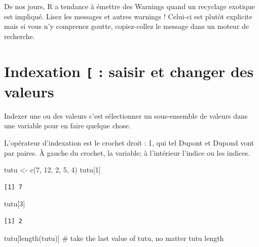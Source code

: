 \documentclass[
  letterpaper,
  DIV=11,
  numbers=noendperiod]{scrreprt}
\newenvironment{Shaded}{\begin{snugshade}}{\end{snugshade}}
\newcommand{\CommentTok}[1]{\textcolor[rgb]{0.37,0.37,0.37}{#1}}
\newcommand{\DecValTok}[1]{\textcolor[rgb]{0.68,0.00,0.00}{#1}}
\newcommand{\FunctionTok}[1]{\textcolor[rgb]{0.28,0.35,0.67}{#1}}
\newcommand{\NormalTok}[1]{\textcolor[rgb]{0.00,0.23,0.31}{#1}}
\newcommand{\OtherTok}[1]{\textcolor[rgb]{0.00,0.23,0.31}{#1}}
\begin{document}
De nos jours, R a tendance à émettre des Warnings quand un recyclage
exotique est impliqué. Lisez les messages et autres warnings ! Celui-ci
est plutôt explicite mais si vous n'y comprenez goutte, copiez-collez le
message dans un moteur de recherche.

\hypertarget{indexation-saisir-et-changer-des-valeurs}{%
\section{\texorpdfstring{Indexation \texttt{{[}} : saisir et changer des
valeurs}{Indexation {[} : saisir et changer des valeurs}}\label{indexation-saisir-et-changer-des-valeurs}}

Indexer une ou des valeurs c'est sélectionner un sous-ensemble de
valeurs dans une variable pour en faire quelque chose.

L'opérateur d'indexation est le crochet droit : \texttt{{[}}, qui tel
Dupont et Dupond vont par paires. À gauche du crochet, la variable; à
l'intérieur l'indice ou les indices.

\begin{Shaded}
\begin{Highlighting}[]
\NormalTok{tutu }\OtherTok{\textless{}{-}} \FunctionTok{c}\NormalTok{(}\DecValTok{7}\NormalTok{, }\DecValTok{12}\NormalTok{, }\DecValTok{2}\NormalTok{, }\DecValTok{5}\NormalTok{, }\DecValTok{4}\NormalTok{)}
\NormalTok{tutu[}\DecValTok{1}\NormalTok{]}
\end{Highlighting}
\end{Shaded}

\begin{verbatim}
[1] 7
\end{verbatim}

\begin{Shaded}
\begin{Highlighting}[]
\NormalTok{tutu[}\DecValTok{3}\NormalTok{]}
\end{Highlighting}
\end{Shaded}

\begin{verbatim}
[1] 2
\end{verbatim}

\begin{Shaded}
\begin{Highlighting}[]
\NormalTok{tutu[}\FunctionTok{length}\NormalTok{(tutu)] }\CommentTok{\# take the last value of tutu, no matter tutu\textquotesingle{} length}
\end{Highlighting}
\end{Shaded}
\end{document}
